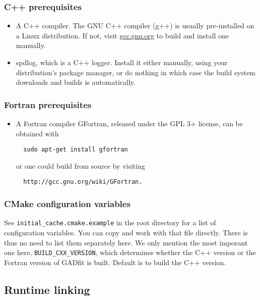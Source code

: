 \documentclass{article}
\begin{document}
\subsubsection{\label{sec:cxx_prerequisites}C++ prerequisites}

\begin{itemize}
\item A C++ compiler. The GNU C++ compiler (g++) is usually pre-installed on a Linux distribution. If not, visit \url{gcc.gnu.org} to build and install one manually.
\item spdlog, which is a C++ logger. Install it either manually, using your distribution's package manager, or do nothing in which case the build system downloads and builds is automatically.
\end{itemize}

\subsubsection{\label{sec:fortran_prerequisites}Fortran prerequisites}

\begin{itemize}
\item A Fortran compiler
  GFortran, released under the GPL 3+ license, can be obtained with
\begin{verbatim}
  sudo apt-get install gfortran
\end{verbatim}
  or one could build from source by visiting
\begin{verbatim}
  http://gcc.gnu.org/wiki/GFortran.
\end{verbatim}
\end{itemize}

\subsubsection{\label{sec:cmake_configuration}CMake configuration variables}

See \verb+initial_cache.cmake.example+ in the root directory for a list of configuration variables. You can copy and work with that file directly. There is thus no need to list them separately here. We only mention the most imporant one here, \verb+BUILD_CXX_VERSION+, which determines whether the C++ version or the Fortran version of GADfit is built. Default is to build the C++ version.

\subsection{\label{sec:runtime}Runtime linking}
\end{document}
